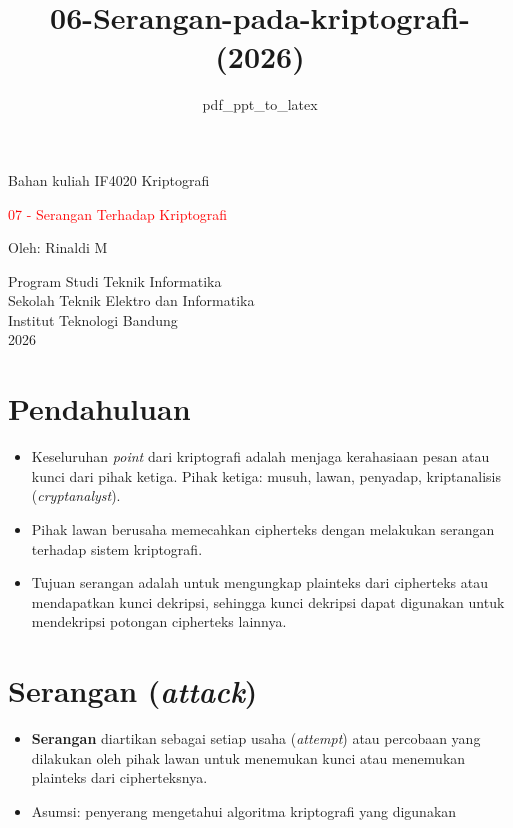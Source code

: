 \documentclass{article}
\title{06-Serangan-pada-kriptografi-(2026)}
\author{pdf\_ppt\_to\_latex}
\date{}
\begin{document}

\begin{center}
Bahan kuliah IF4020 Kriptografi

\Huge \textcolor{red}{07 - Serangan Terhadap Kriptografi}

\vspace{40mm}

\Large Oleh: Rinaldi M

\vspace{10mm}

\large Program Studi Teknik Informatika \\
Sekolah Teknik Elektro dan Informatika \\
Institut Teknologi Bandung \\
2026
\end{center}

\newpage


\section*{Pendahuluan}

\begin{itemize}
    \item Keseluruhan \textit{point} dari kriptografi adalah menjaga kerahasiaan pesan atau kunci dari pihak ketiga. Pihak ketiga: musuh, lawan, penyadap, kriptanalisis (\textit{cryptanalyst}).
    \item Pihak lawan berusaha memecahkan cipherteks dengan melakukan serangan terhadap sistem kriptografi.
    \item Tujuan serangan adalah untuk mengungkap plainteks dari cipherteks atau mendapatkan kunci dekripsi, sehingga kunci dekripsi dapat digunakan untuk mendekripsi potongan cipherteks lainnya.
\end{itemize}

\newpage


\section*{Serangan (\textit{attack})}

\begin{itemize}
    \item \textbf{Serangan} diartikan sebagai setiap usaha (\textit{attempt}) atau percobaan yang dilakukan oleh pihak lawan untuk menemukan kunci atau menemukan plainteks dari cipherteksnya.
    \item Asumsi: penyerang mengetahui algoritma kriptografi yang digunakan
\end{itemize}
\end{document}
